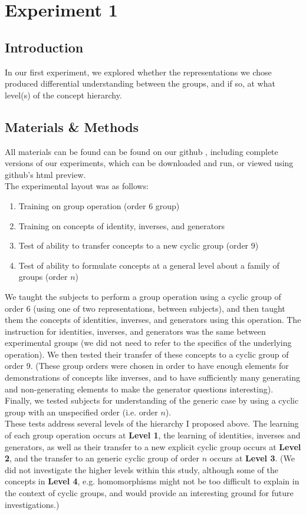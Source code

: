 \documentclass[11pt]{article}
\begin{document}
\section{Experiment 1}
\subsection{Introduction}
In our first experiment, we explored whether the representations we chose produced differential understanding between the groups, and if so, at what level(s) of the concept hierarchy.
\subsection{Materials \& Methods} 
All materials can be found can be found on our github \cite{RepresentationsGithub}, including complete versions of our experiments, which can be downloaded and run, or viewed using github's html preview. \\[11pt]
The experimental layout was as follows:
\begin{enumerate}
\item Training on group operation (order 6 group)
\item Training on concepts of identity, inverses, and generators
\item Test of ability to transfer concepts to a new cyclic group (order 9)
\item Test of ability to formulate concepts at a general level about a family of groups (order $n$)
\end{enumerate}
We taught the subjects to perform a group operation using a cyclic group of order 6 (using one of two representations, between subjects), and then taught them the concepts of identities, inverses, and generators using this operation. The instruction for identities, inverses, and generators was the same between experimental groups (we did not need to refer to the specifics of the underlying operation). We then tested their transfer of these concepts to a cyclic group of order 9. (These group orders were chosen in order to have enough elements for demonstrations of concepts like inverses, and to have sufficiently many generating and non-generating elements to make the generator questions interesting). Finally, we tested subjects for understanding of the generic case by using a cyclic group with an unspecified order (i.e. order $n$). \\[11pt]
These tests address several levels of the hierarchy I proposed above. The learning of each group operation occurs at \textbf{Level 1}, the learning of identities, inverses and generators, as well as their transfer to a new explicit cyclic group occurs at \textbf{Level 2}, and the transfer to an generic cyclic group of order $n$ occurs at \textbf{Level 3}. (We did not investigate the higher levels within this study, although some of the concepts in \textbf{Level 4}, e.g. homomorphisms might not be too difficult to explain in the context of cyclic groups, and would provide an interesting ground for future investigations.)  
\end{document}
